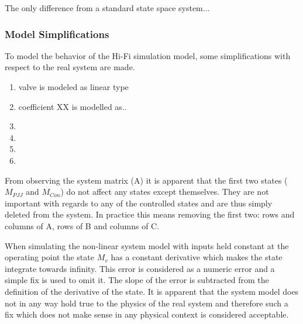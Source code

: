 The only difference from a standard state space system...

\subsubsection{Model Simplifications}
To model the behavior of the Hi-Fi simulation model, some simplifications with respect to the real system are made.

\begin{enumerate}
	\item valve is modeled as linear type
	\item coefficient XX is modelled as..
	\item
	\item
	\item
	\item
\end{enumerate}

From observing the system matrix (A) it is apparent that the first two states ($M_{PJJ}$ and $M_{Con}$) do not affect any states except themselves. They are not important with regards to any of the controlled states and are thus simply deleted from the system. In practice this means removing the first two: rows and columns of A, rows of B and columns of C.

When simulating the non-linear system model with inputs held constant at the operating point the state $M_v$ has a constant derivative which makes the state integrate towards infinity. This error is considered as a numeric error  and a simple fix is used to omit it. The slope of the error is subtracted from the definition of the derivative of the state. It is apparent that the system model does not in any way hold true to the physics of the real system and therefore such a fix which does not make sense in any physical context is considered acceptable.

